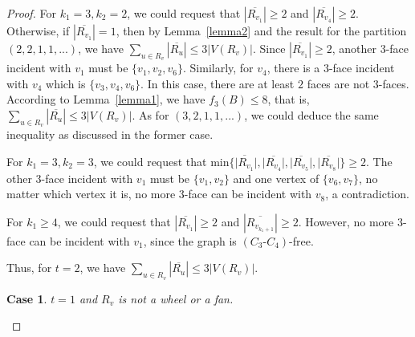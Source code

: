 \documentclass[12pt]{article}
\newtheorem{case}{Case}[section]
\begin{document}
\begin{proof}
    For $k_1=3,k_2=2$, we could request that $|\overline{R_{v_1}}| \geq 2$ and $|\overline{R_{v_4}}| \geq 2$. Otherwise, if $|\overline{R_{v_1}}| = 1$, then by Lemma~\ref{lemma2} and the result for the partition $(2,2,1,1,...)$, we have $\sum_{u \in R_v}|\overline{R_u}| \leq 3|V(R_v)|$. Since $|\overline{R_{v_1}}|\geq 2$, another $3$-face incident with $v_1$ must be $\{v_1,v_2,v_6\}$. Similarly, for $v_4$, there is a $3$-face incident with $v_4$ which is $\{v_3,v_4,v_6\}$. In this case, there are at least $2$ faces are not $3$-faces. According to Lemma~\ref{lemma1}, we have $f_3(B)\leq 8$, that is, $\sum_{u \in R_v}|\overline{R_u}| \leq 3|V(R_v)|$. As for $(3,2,1,1,...)$, we could deduce the same inequality as discussed in the former case.
    
    For $k_1=3,k_2=3$, we could request that $\mbox{min}\{\overline{|R_{v_1}}|,|\overline{R_{v_4}}|,|\overline{R_{v_5}}|,|\overline{R_{v_8}}|\} \geq 2$. The other $3$-face incident with $v_1$ must be $\{v_1,v_2\}$ and one vertex of $\{v_6,v_7\}$, no matter which vertex it is, no more $3$-face can be incident with $v_8$, a contradiction.
    
    For $k_1 \geq 4$, we could request that $|\overline{R_{v_1}}| \geq 2$ and $|\overline{R_{v_{k_1+1}}}| \geq 2$. However, no more $3$-face can be incident with $v_1$, since the graph is $(C_3\text{-}C_4)$-free.
    
    Thus, for $t=2$, we have $\sum_{u \in R_v}|\overline{R_u}| \leq 3|V(R_v)|$.
    
    \begin{case}
        $t=1$ and $R_v$ is not a wheel or a fan.
    \end{case}
    

\end{proof}
\end{document}
